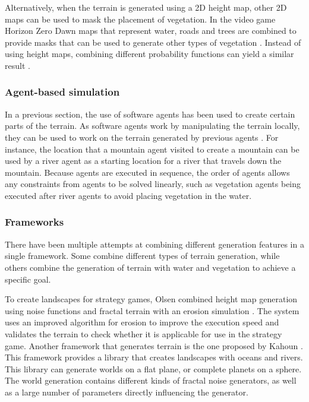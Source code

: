 \documentclass{article}
\begin{document}
Alternatively, when the terrain is generated using a 2D height map, other 2D maps can be used to mask the placement of vegetation. In the video game Horizon Zero Dawn maps that represent water, roads and trees are combined to provide masks that can be used to generate other types of vegetation \cite{van_muijden_gpu-based_2017}. Instead of using height maps, combining different probability functions can yield a similar result \cite{weier_generating_2013}.

\subsubsection{Agent-based simulation}
In a previous section, the use of software agents has been used to create certain parts of the terrain. As software agents work by manipulating the terrain locally, they can be used to work on the terrain generated by previous agents \cite{doran_controlled_2010}. For instance, the location that a mountain agent visited to create a mountain can be used by a river agent as a starting location for a river that travels down the mountain. Because agents are executed in sequence, the order of agents allows any constraints from agents to be solved linearly, such as vegetation agents being executed after river agents to avoid placing vegetation in the water.

\subsubsection{Frameworks}
There have been multiple attempts at combining different generation features in a single framework. Some combine different types of terrain generation, while others combine the generation of terrain with water and vegetation to achieve a specific goal.

To create landscapes for strategy games, Olsen combined height map generation using noise functions and fractal terrain with an erosion simulation \cite{olsen_realtime_2004}. The system uses an improved algorithm for erosion to improve the execution speed and validates the terrain to check whether it is applicable for use in the strategy game. Another framework that generates terrain is the one proposed by Kahoun \cite{kahoun_realtime_2013}. This framework provides a library that creates landscapes with oceans and rivers. This library can generate worlds on a flat plane, or complete planets on a sphere. The world generation contains different kinds of fractal noise generators, as well as a large number of parameters directly influencing the generator.
\end{document}
